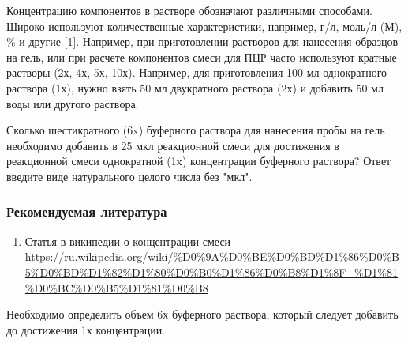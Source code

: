 
Концентрацию компонентов в растворе обозначают различными способами. Широко используют 
количественные характеристики, например, г/л, моль/л (М), \% и другие [1]. 
Например, при приготовлении растворов для нанесения образцов на гель, или при 
расчете компонентов смеси для ПЦР часто используют кратные растворы (2х, 4х, 5х, 10х). 
Например, для приготовления 100 мл однократного раствора (1х), нужно взять 50 мл двукратного раствора 
(2х) и добавить 50 мл воды или другого раствора.

Сколько шестикратного (6x) буферного раствора для нанесения пробы на гель необходимо добавить в 25 мкл реакционной смеси для достижения в реакционной смеси однократной (1x) концентрации буферного раствора? Ответ введите виде натурального целого числа без "мкл". 

\subsubsection*{Рекомендуемая литература}

\begin{enumerate}
    \item Статья в википедии о концентрации смеси \url{https://ru.wikipedia.org/wiki/%D0%9A%D0%BE%D0%BD%D1%86%D0%B5%D0%BD%D1%82%D1%80%D0%B0%D1%86%D0%B8%D1%8F_%D1%81%D0%BC%D0%B5%D1%81%D0%B8}
\end{enumerate}

\explanationSection

Необходимо определить объем 6х буферного раствора, который следует добавить до достижения 1х концентрации.

